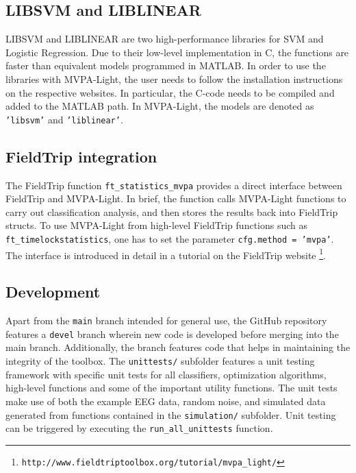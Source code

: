 \documentclass[utf8]{frontiersSCNS} %
\newcommand{\ttt}[1]{\texttt{#1}}
\begin{document}
\subsection{LIBSVM and LIBLINEAR}

LIBSVM \citep{Chang2011LIBSVM:Machines} and LIBLINEAR \citep{Fan2008} are two high-performance libraries for SVM and Logistic Regression. Due to their low-level implementation in C, the functions are faster than equivalent models programmed in MATLAB. In order to use the libraries with MVPA-Light, the user needs to follow the installation instructions on the respective websites. In particular, the C-code needs to be compiled and added to the MATLAB path. In MVPA-Light, the models are denoted as \ttt{'libsvm'} and \ttt{'liblinear'}.

\subsection{FieldTrip integration}

The FieldTrip \citep{Oostenveld2011} function \ttt{ft\_statistics\_mvpa} provides a direct interface between FieldTrip and MVPA-Light. In brief, the function calls MVPA-Light functions to carry out classification analysis, and then stores the results back into FieldTrip structs. To use MVPA-Light from high-level FieldTrip functions such as \ttt{ft\_timelockstatistics}, one has to set the parameter \ttt{cfg.method = 'mvpa'}. The interface is introduced in detail in a tutorial on the FieldTrip website \footnote{\ttt{http://www.fieldtriptoolbox.org/tutorial/mvpa\_light/}}.

\subsection{Development}\label{sec:development}

Apart from the \ttt{main} branch intended for general use, the GitHub repository features a \ttt{devel} branch wherein new code is developed before merging into the main branch. Additionally, the branch features code that helps in maintaining the integrity of the toolbox. The \ttt{unittests/} subfolder features a unit testing framework with specific unit tests for all classifiers, optimization algorithms, high-level functions and some of the important utility functions. The unit tests make use of both the example EEG data, random noise, and simulated data generated from functions contained in the \ttt{simulation/} subfolder. Unit testing can be triggered by executing the \ttt{run\_all\_unittests} function.
\end{document}
